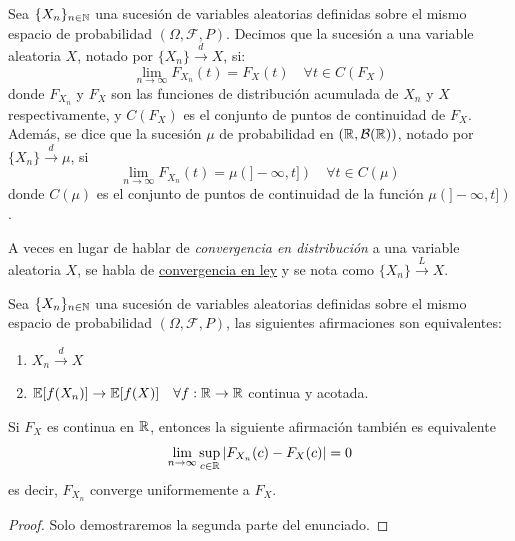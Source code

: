 \begin{definicion}
    Sea $\{X_n\}_{n\in \mathbb{N}}$ una sucesión de variables aleatorias definidas sobre el mismo espacio de probabilidad $(\Omega, \mathcal{F}, P)$. Decimos que la sucesión  a una variable aleatoria $X$, notado por $\{X_n\} \xrightarrow{d} X$, si:
    \begin{equation*}
        \lim_{n\to \infty} F_{X_n}(t) = F_X(t) \quad \forall t \in C(F_X)
    \end{equation*}
    donde $F_{X_n}$ y $F_X$ son las funciones de distribución acumulada de $X_n$ y $X$ respectivamente, y $C(F_X)$ es el conjunto de puntos de continuidad de $F_X$. \\
    \noindent
    Además, se dice que la sucesión  $\mu$ de probabilidad en $(\mathbb{R}, \mathcal{B}(\mathbb{R}))$, notado por $\{X_n\} \xrightarrow{d} \mu$, si
    \begin{equation*}
        \lim_{n\to \infty} F_{X_n}(t) = \mu(]-\infty, t]) \quad \forall t \in C(\mu)
    \end{equation*}
    donde $C(\mu)$ es el conjunto de puntos de continuidad de la función $\mu(]-\infty, t])$.
\end{definicion}

\begin{notacion}
    A veces en lugar de hablar de \textit{convergencia en distribución} a una variable aleatoria $X$, se habla de \underline{convergencia en ley} y se nota como $\{X_n\} \xrightarrow{L} X$.
\end{notacion}

\begin{lema}
    Sea $\{X_n\}_{n\in \mathbb{N}}$ una sucesión de variables aleatorias definidas sobre el mismo espacio de probabilidad $(\Omega, \mathcal{F}, P)$, las siguientes afirmaciones son equivalentes:
    \begin{enumerate}[label=\arabic*)]
        \item $X_n \xrightarrow{d} X$
        \item $\mathbb{E}[f(X_n)] \to \mathbb{E}[f(X)] \quad \forall f:\mathbb{R} \to \mathbb{R}$ continua y acotada.
    \end{enumerate}
    Si $F_X$ es continua en $\mathbb{R}$, entonces la siguiente afirmación también es equivalente
    \begin{equation*}
        \lim_{n\to \infty} \sup_{c\in \mathbb{R}} |F_{X_n}(c)-F_X(c)|=0
    \end{equation*}
    es decir, $F_{X_n}$ converge uniformemente a $F_X$.
    \begin{proof}
        Solo demostraremos la segunda parte del enunciado.
    \end{proof}
\end{lema}

